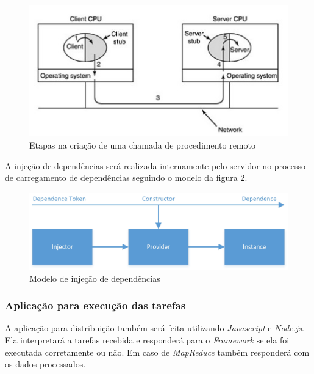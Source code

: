 \begin{figure}[htb]
	\caption{\label{fig:criacao-chamada}Etapas na criação de uma chamada de procedimento remoto}
	\begin{center}
		\includegraphics[width=1\textwidth]{img/criacao-chamada.jpg}
	\end{center}
\end{figure}

A injeção de dependências será realizada internamente pelo servidor no processo
de carregamento de dependências seguindo o modelo da
figura \ref{fig:injecao-dependencias}.

\begin{figure}[htb]
	\caption{\label{fig:injecao-dependencias}Modelo de injeção de dependências}
	\begin{center}
		\includegraphics[width=1\textwidth]{img/injecao-dependencias.jpg}
	\end{center}
\end{figure}

\pagebreak
\subsubsection{Aplicação para execução das tarefas}
A aplicação para distribuição também será feita utilizando \emph{Javascript} e
\emph{Node.js}. Ela interpretará a tarefas recebida e responderá para o
\emph{Framework} se ela foi executada corretamente ou não. Em caso de
\emph{MapReduce} também responderá com os dados processados.

